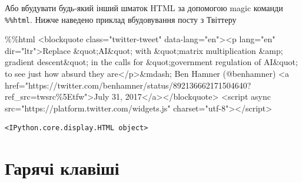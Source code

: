 \documentclass[
  letterpaper,
]{report}
\newenvironment{Shaded}{\begin{snugshade}}{\end{snugshade}}
\newcommand{\BuiltInTok}[1]{\textcolor[rgb]{0.00,0.23,0.31}{#1}}
\newcommand{\ControlFlowTok}[1]{\textcolor[rgb]{0.00,0.23,0.31}{#1}}
\newcommand{\DecValTok}[1]{\textcolor[rgb]{0.68,0.00,0.00}{#1}}
\newcommand{\KeywordTok}[1]{\textcolor[rgb]{0.00,0.23,0.31}{#1}}
\newcommand{\NormalTok}[1]{\textcolor[rgb]{0.00,0.23,0.31}{#1}}
\newcommand{\OperatorTok}[1]{\textcolor[rgb]{0.37,0.37,0.37}{#1}}
\newcommand{\SpecialCharTok}[1]{\textcolor[rgb]{0.37,0.37,0.37}{#1}}
\newcommand{\StringTok}[1]{\textcolor[rgb]{0.13,0.47,0.30}{#1}}
\begin{document}
Або вбудувати будь-який інший шматок HTML за допомогою magic команди
\texttt{\%\%html}. Нижче наведено приклад вбудовування посту з Твіттеру

\begin{Shaded}
\begin{Highlighting}[]
\OperatorTok{\%\%}\NormalTok{html}
\OperatorTok{\textless{}}\NormalTok{blockquote }\KeywordTok{class}\OperatorTok{=}\StringTok{"twitter{-}tweet"}\NormalTok{ data}\OperatorTok{{-}}\NormalTok{lang}\OperatorTok{=}\StringTok{"en"}\OperatorTok{\textgreater{}\textless{}}\NormalTok{p lang}\OperatorTok{=}\StringTok{"en"} \BuiltInTok{dir}\OperatorTok{=}\StringTok{"ltr"}\OperatorTok{\textgreater{}}\NormalTok{Replace }\OperatorTok{\&}\NormalTok{quot}\OperatorTok{;}\NormalTok{AI}\OperatorTok{\&}\NormalTok{quot}\OperatorTok{;} \ControlFlowTok{with} \OperatorTok{\&}\NormalTok{quot}\OperatorTok{;}\NormalTok{matrix multiplication }\OperatorTok{\&}\NormalTok{amp}\OperatorTok{;}\NormalTok{ gradient descent}\OperatorTok{\&}\NormalTok{quot}\OperatorTok{;} \KeywordTok{in}\NormalTok{ the calls }\ControlFlowTok{for} \OperatorTok{\&}\NormalTok{quot}\OperatorTok{;}\NormalTok{government regulation of AI}\OperatorTok{\&}\NormalTok{quot}\OperatorTok{;}\NormalTok{ to see just how absurd they are}\OperatorTok{\textless{}/}\NormalTok{p}\OperatorTok{\textgreater{}\&}\NormalTok{mdash}\OperatorTok{;}\NormalTok{ Ben Hamner (}\OperatorTok{@}\NormalTok{benhamner) }\OperatorTok{\textless{}}\NormalTok{a href}\OperatorTok{=}\StringTok{"https://twitter.com/benhamner/status/892136662171504640?ref\_src=twsrc}\SpecialCharTok{\%5E}\StringTok{tfw"}\OperatorTok{\textgreater{}}\NormalTok{July }\DecValTok{31}\NormalTok{, }\DecValTok{2017}\OperatorTok{\textless{}/}\NormalTok{a}\OperatorTok{\textgreater{}\textless{}/}\NormalTok{blockquote}\OperatorTok{\textgreater{}}
\OperatorTok{\textless{}}\NormalTok{script }\ControlFlowTok{async}\NormalTok{ src}\OperatorTok{=}\StringTok{"https://platform.twitter.com/widgets.js"}\NormalTok{ charset}\OperatorTok{=}\StringTok{"utf{-}8"}\OperatorTok{\textgreater{}\textless{}/}\NormalTok{script}\OperatorTok{\textgreater{}}
\end{Highlighting}
\end{Shaded}

\begin{verbatim}
<IPython.core.display.HTML object>
\end{verbatim}

\hypertarget{ux433ux430ux440ux44fux447ux456-ux43aux43bux430ux432ux456ux448ux456}{%
\section{Гарячі
клавіші}\label{ux433ux430ux440ux44fux447ux456-ux43aux43bux430ux432ux456ux448ux456}}
\end{document}
